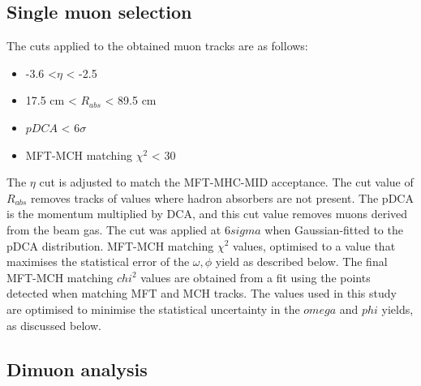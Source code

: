    \subsection{Single muon selection}
    \label{Single_muon_selection}
        The cuts applied to the obtained muon tracks are as follows:
        \begin{itemize}{}
            \item -3.6 <$\eta$ < -2.5
            \item 17.5 cm < $R_{abs}$ < 89.5 cm
            \item $pDCA$ < 6$\sigma$
            \item MFT-MCH matching $\chi^2$ < 30
        \end{itemize}
        The $\eta$ cut is adjusted to match the MFT-MHC-MID acceptance. 
        The cut value of $R_{abs}$ removes tracks of values where hadron absorbers are not present.
        The pDCA is the momentum multiplied by DCA, and this cut value removes muons derived from the beam gas. The cut was applied at 6$sigma$ when Gaussian-fitted to the pDCA distribution.
        MFT-MCH matching $\chi^2$ values, optimised to a value that maximises the statistical error of the $\omega,\phi$ yield as described below.
        The final MFT-MCH matching $chi^2$ values are obtained from a fit using the points detected when matching MFT and MCH tracks. The values used in this study are optimised to minimise the statistical uncertainty in the $omega$ and $phi$ yields, as discussed below.
    
        \subsection{Dimuon analysis}
        \label{Dimuon}
